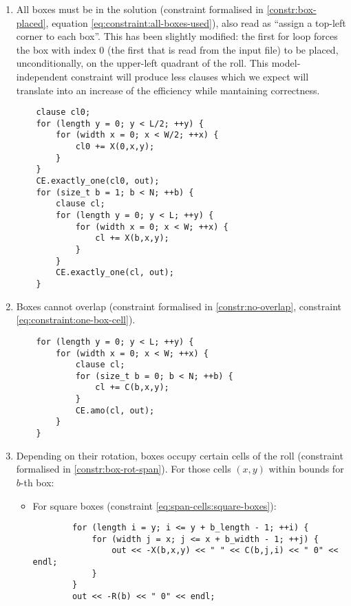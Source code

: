 \begin{enumerate}
	\item All boxes must be in the solution (constraint formalised in
	\ref{constr:box-placed}, equation \ref{eq:constraint:all-boxes-used}),
	also read as ``assign a top-left corner to each box''. This has been
	slightly modified: the first for loop forces the box with index 0 (the first
	that is read from the input file) to be placed, unconditionally, on the upper-left
	quadrant of the roll. This model-independent constraint will produce less
	clauses which we expect will translate into an increase of the efficiency while
	mantaining correctness.
    
	{\NOINDENT \begin{lstlisting}
	clause cl0;
	for (length y = 0; y < L/2; ++y) {
		for (width x = 0; x < W/2; ++x) {
			cl0 += X(0,x,y);
		}
	}
	CE.exactly_one(cl0, out);
	for (size_t b = 1; b < N; ++b) {
		clause cl;
		for (length y = 0; y < L; ++y) {
			for (width x = 0; x < W; ++x) {
				cl += X(b,x,y);
			}
		}
		CE.exactly_one(cl, out);
	}
	\end{lstlisting}}
    
	\item Boxes cannot overlap (constraint formalised in
	\ref{constr:no-overlap}, constraint \ref{eq:constraint:one-box-cell}).
    
	{\NOINDENT \begin{lstlisting}
	for (length y = 0; y < L; ++y) {
		for (width x = 0; x < W; ++x) {
			clause cl;
			for (size_t b = 0; b < N; ++b) {
				cl += C(b,x,y);
			}
			CE.amo(cl, out);
		}
	}
	\end{lstlisting}}
    
	\item Depending on their rotation, boxes occupy certain cells of the roll
	(constraint formalised in \ref{constr:box-rot-span}). For those cells $(x,y)$ within
	bounds for $b$-th box:

	\begin{itemize}
		\item For square boxes (constraint \ref{eq:span-cells:square-boxes}):
		{\NOINDENT \begin{lstlisting}
		for (length i = y; i <= y + b_length - 1; ++i) {
			for (width j = x; j <= x + b_width - 1; ++j) {
				out << -X(b,x,y) << " " << C(b,j,i) << " 0" << endl;
			}
		}
		out << -R(b) << " 0" << endl;
		\end{lstlisting}}
		

\end{itemize}
\end{enumerate}
